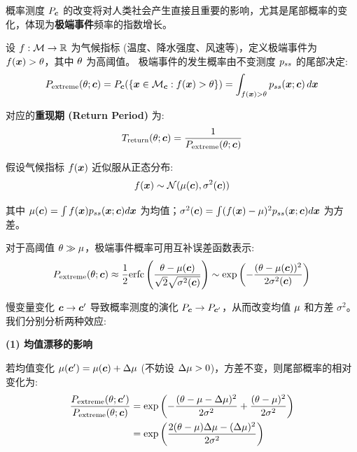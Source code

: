 概率测度 $P_{\bm{c}}$ 的改变将对人类社会产生直接且重要的影响，尤其是尾部概率的变化，体现为\textbf{极端事件}频率的指数增长。

设 $f: \mathcal{M} \to \mathbb{R}$ 为气候指标 (温度、降水强度、风速等)，定义极端事件为 $f(\bm{x}) > \theta$，其中 $\theta$ 为高阈值。
极端事件的发生概率由不变测度 $p_{ss}$ 的尾部决定:
\begin{equation}
\label{eq:extreme_prob}
    P_{\text{extreme}}(\theta; \bm{c}) = P_{\bm{c}}(\{\bm{x} \in \mathcal{M}_{\bm{c}} : f(\bm{x}) > \theta\}) = \int_{f(\bm{x}) > \theta} p_{ss}(\bm{x}; \bm{c}) \, d\bm{x}
\end{equation}

对应的\textbf{重现期 (Return Period)} 为:
\begin{equation}
\label{eq:return_period}
    T_{\text{return}}(\theta; \bm{c}) = \frac{1}{P_{\text{extreme}}(\theta; \bm{c})}
\end{equation}

假设气候指标 $f(\bm{x})$ 近似服从正态分布:
\begin{equation}
\label{eq:normal_approx}
    f(\bm{x}) \sim \mathcal{N}(\mu(\bm{c}), \sigma^2(\bm{c}))
\end{equation}

其中 $\mu(\bm{c}) = \int f(\bm{x}) p_{ss}(\bm{x}; \bm{c}) d\bm{x}$ 为均值；$\sigma^2(\bm{c}) = \int (f(\bm{x}) - \mu)^2 p_{ss}(\bm{x}; \bm{c}) d\bm{x}$ 为方差。

对于高阈值 $\theta \gg \mu$，极端事件概率可用互补误差函数表示:
\begin{equation}
    \label{eq:extreme_prob_normal}
        P_{\text{extreme}}(\theta; \bm{c}) \approx \frac{1}{2}\mathrm{erfc}\left(\frac{\theta - \mu(\bm{c})}{\sqrt{2}\sqrt{\sigma^2(\bm{c})}}\right) \sim \exp\left(-\frac{(\theta - \mu(\bm{c}))^2}{2\sigma^2(\bm{c})}\right)
    \end{equation}

慢变量变化 $\bm{c} \to \bm{c}'$ 导致概率测度的演化 $P_{\bm{c}} \to P_{\bm{c}'}$，从而改变均值 $\mu$ 和方差 $\sigma^2$。
我们分别分析两种效应:

\textbf{(1) 均值漂移的影响}

若均值变化 $\mu(\bm{c}') = \mu(\bm{c}) + \Delta \mu$ (不妨设 $\Delta \mu > 0$)，方差不变，则尾部概率的相对变化为:
\begin{align*}
    \frac{P_{\text{extreme}}(\theta; \bm{c}')}{P_{\text{extreme}}(\theta; \bm{c})} &= \exp\left(-\frac{(\theta - \mu - \Delta\mu)^2}{2\sigma^2} + \frac{(\theta - \mu)^2}{2\sigma^2}\right) \\
    &= \exp\left(\frac{2(\theta - \mu)\Delta\mu - (\Delta\mu)^2}{2\sigma^2}\right)
\end{align*}

